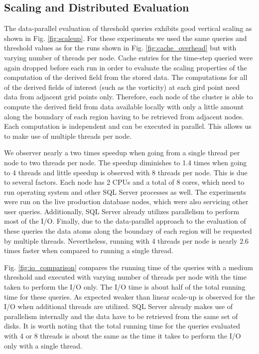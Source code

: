 \documentclass{sig-alternate}
\newcommand{\kk}[1]{{\color{blue}{\it KK: #1}}}
\begin{document}
\subsection{Scaling and Distributed Evaluation}
The data-parallel evaluation of threshold queries exhibits good vertical scaling as shown in Fig. \ref{fig:scaleup}. For these experiments we used the same
queries and threshold values as for the runs shown in Fig. \ref{fig:cache_overhead} but with varying number of threads per node. Cache entries for the
time-step queried were again dropped before each run in order to evaluate the scaling properties of the computation of the derived field from the stored data.
The computations for all of 
the derived fields of interest (such as the vorticity) at each gird point need data from adjacent grid points only. Therefore, each node of the cluster is able to
compute the derived field from data available locally with only a little amount along the boundary of each region having to be retrieved from adjacent nodes.
Each computation is independent and can be executed in parallel. This allows us to make use of multiple threads per node. 

We observer nearly a two times speedup when going from a single thread per node to two threads per node. The speedup diminishes to 1.4 times when going 
to 4 threads and little speedup is 
observed with 8 threads per node. This is due to several factors. Each node has 2 CPUs and a total of 8 cores, which need to run operating system and other SQL Server
processes as well. The experiments were run on the live production database nodes, which were also servicing other user queries. Additionally, SQL
Server already utilizes parallelism to perform most of the I/O. Finally, due to the data-parallel approach to the evaluation of these queries the data atoms along
the boundary of each region will be requested by multiple threads. Nevertheless, running with 4 threads per node is nearly 2.6 times faster when compared to
running a single thread.
\kk{Should we have scale-out experiments as well?}

Fig. \ref{fig:io_comparison} compares the running time of the queries with a medium threshold and executed with varying number of threads per node with
the time taken to perform the I/O only. The I/O time is about half of the total running time for these queries. As expected weaker than linear scale-up is 
observed for the I/O when additional threads are utilized. SQL Server already makes use of parallelism internally and the data have to be retrieved from the
same set of disks. It is worth noting that the total running time for the queries evaluated with 4 or 8 threads is about the same as the time it takes to perform the
I/O only with a single thread.
\end{document}

